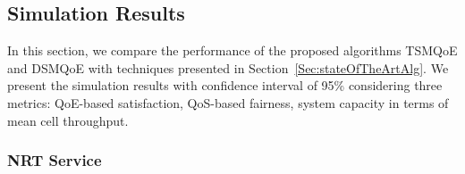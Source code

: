 \documentclass[conference]{IEEEtran}
\newcommand{\SecRef}[1]{Section~\ref{#1}}
\begin{document}
\subsection{Simulation Results}
\label{Sec:Results}

In this section, we compare the performance of the proposed algorithms TSMQoE and DSMQoE with techniques presented in \SecRef{Sec:stateOfTheArtAlg}. We present the simulation results with confidence interval of 95\% considering three metrics: \ac{QoE}-based satisfaction, \ac{QoS}-based fairness, system capacity in terms of mean cell throughput.

\subsubsection{NRT Service}
\end{document}
